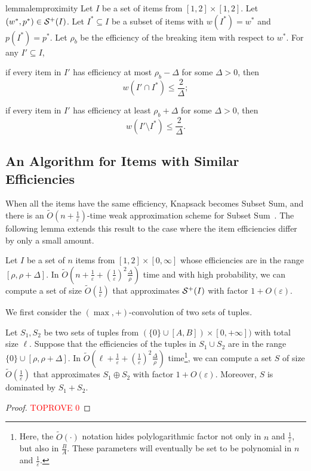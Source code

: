 \documentclass[a4paper,UKenglish,cleveref, autoref, thm-restate, pdfa]{lipics-v2021}
\newcommand{\eps}{\varepsilon}
\renewcommand{\leq}{\leqslant}
\begin{document}
\begin{restatable}{lemma}{lemproximity}\label{lem:proximity}
    Let $I$ be a set of items from $[1,2]\times [1,2]$. Let $(w^*, p^*) \in {\cal S}^+(I)$.   Let $I^* \subseteq I$ be a subset of items with $w(I^*) = w^*$ and $p(I^*) = p^*$.  Let $\rho_b$ be the efficiency of the breaking item with respect to $w^*$.  For any $I' \subseteq I$, 
    \begin{romanenumerate}
        \item if every item in $I'$ has efficiency at most $\rho_b - \Delta$ for some $\Delta > 0$, then 
        \[
            w(I' \cap I^*) \leq \frac{2}{\Delta};
        \]

        \item if every item in $I'$ has efficiency at least $\rho_b + \Delta$ for some $\Delta > 0$, then 
        \[
            w(I' \setminus  I^*) \leq \frac{2}{\Delta}.
        \]
    \end{romanenumerate}
\end{restatable}

\subsection{An Algorithm for Items with Similar Efficiencies}
When all the items have the same efficiency, Knapsack becomes Subset Sum, and there is an $\tilde{O}(n + \frac{1}{\eps})$-time weak approximation scheme for Subset Sum~\cite{CLMZ24cSTOCPartition}. The following lemma extends this result to the case where the item efficiencies differ by only a small amount. 


\begin{lemma}\label{lem:alg-for-similar-eff}
    Let $I$ be a set of $n$ items from $[1,2]\times [0,\infty]$ whose efficiencies are in the range $[\rho, \rho + \Delta]$. In $\tilde{O}(n + \frac{1}{\eps} + (\frac{1}{\eps})^2 \frac{\Delta}{\rho})$ time and with high probability, we can compute a set of size $\tilde{O}(\frac{1}{\eps})$ that approximates ${\cal S}^+(I)$ with factor $1 + O(\eps)$.
\end{lemma}

We first consider the $(\max, +)$-convolution of two sets of tuples.
\begin{lemma}\label{lem:2d-fft}
    Let $S_1, S_2$ be two sets of tuples from $(\{0\}\cup[A, B]) \times [0, +\infty])$ with total size $\ell$. Suppose that the efficiencies of the tuples in $S_1 \cup S_2$ are in the range $\{0\} \cup [\rho, \rho + \Delta]$. In $\tilde{O}(\ell + \frac{1}{\eps} + (\frac{1}{\eps})^2\frac{\Delta}{\rho})$ time\footnote{Here, the $\tilde{O}(\cdot)$ notation hides polylogarithmic factor not only in $n$ and $\frac{1}{\eps}$, but also in $\frac{B}{A}$. These parameters will eventually be set to be polynomial in $n$ and $\frac{1}{\eps}$.}, we can compute a set $S$ of size $\tilde{O}(\frac{1}{\eps})$ that approximates $S_1 \oplus S_2$ with factor $1 + O(\eps)$. Moreover, $S$ is dominated by $S_1 + S_2$.
\end{lemma}
\begin{proof}\textcolor{red}{TOPROVE 0}\end{proof}
\end{document}
